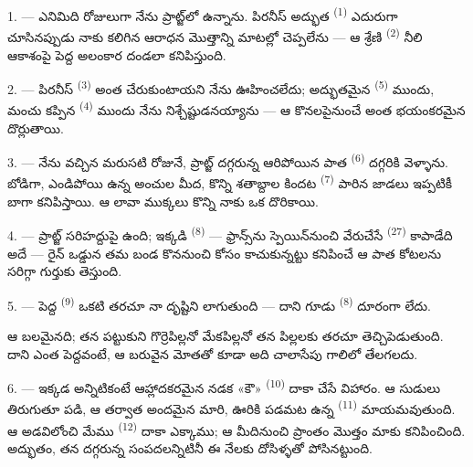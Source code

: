 1. --- ఎనిమిది రోజులుగా నేను ప్రాట్జ్‌లో ఉన్నాను. పిరనీస్ అద్భుత 
\textsuperscript{(1)} ఎదురుగా చూసినప్పుడు నాకు కలిగిన ఆరాధన మొత్తాన్ని మాటల్లో చెప్పలేను —
ఆ శ్రేణి  \textsuperscript{(2)} నీలి ఆకాశంపై పెద్ద అలంకార దండలా
కనిపిస్తుంది.

2. --- పిరనీస్  \textsuperscript{(3)} అంత 
చేరుకుంటాయని నేను ఊహించలేదు; అద్భుతమైన  \textsuperscript{(5)} ముందు,
మంచు కప్పిన  \textsuperscript{(4)} ముందు నేను నిశ్చేష్టుడనయ్యాను — ఆ
కొనలపైనుంచే అంత భయంకరమైన  దొర్లుతాయి.

\VUsaut{5.0mm}
\VUsaut{3.4mm}

3. --- నేను వచ్చిన మరుసటి రోజునే, ప్రాట్జ్ దగ్గరున్న ఆరిపోయిన పాత 
\textsuperscript{(6)} దగ్గరికి వెళ్ళాను. బోడిగా, ఎండిపోయి ఉన్న  అంచుల మీద,
కొన్ని శతాబ్దాల కిందట  \textsuperscript{(7)} పారిన 
జాడలు ఇప్పటికీ బాగా కనిపిస్తాయి. ఆ లావా ముక్కలు కొన్ని నాకు ఒక  దొరికాయి.

4. --- ప్రాట్జ్ సరిహద్దుపై ఉంది; ఇక్కడి  \textsuperscript{(8)} — ఫ్రాన్స్‌ను
స్పెయిన్‌నుంచి వేరుచేసే  \textsuperscript{(27)} కాపాడేది అదే — రైన్ ఒడ్డున
తమ బండ కొననుంచి  కోసం కాచుకున్నట్టు కనిపించే ఆ పాత కోటలను సరిగ్గా గుర్తుకు
తెస్తుంది.

5. --- పెద్ద  \textsuperscript{(9)} ఒకటి తరచూ నా దృష్టిని లాగుతుంది — దాని
గూడు  \textsuperscript{(8)} దూరంగా లేదు.

ఆ   బలమైనది; తన  పట్టుకుని
గొర్రెపిల్లనో మేకపిల్లనో తన పిల్లలకు తరచూ తెచ్చిపెడుతుంది. దాని  ఎంత
పెద్దవంటే, ఆ బరువైన మోతతో కూడా అది చాలాసేపు గాలిలో తేలగలదు.

\VUsaut{5.0mm}
\VUsaut{3.4mm}

6. --- ఇక్కడ అన్నిటికంటే ఆహ్లాదకరమైన నడక «కౌ»  \textsuperscript{(10)} దాకా
చేసే విహారం. ఆ  సుడులు తిరుగుతూ పడి, ఆ తర్వాత అందమైన 
మారి, ఊరికి పడమట ఉన్న  \textsuperscript{(11)} మాయమవుతుంది. ఆ
అడవిలోంచి మేము  \textsuperscript{(12)} దాకా ఎక్కాము; ఆ
 మీదినుంచి ప్రాంతం మొత్తం  మాకు కనిపించింది.
 అద్భుతం, తన దగ్గరున్న సంపదలన్నిటినీ  ఈ నేలకు
దోసిళ్ళతో పోసినట్టుంది.


